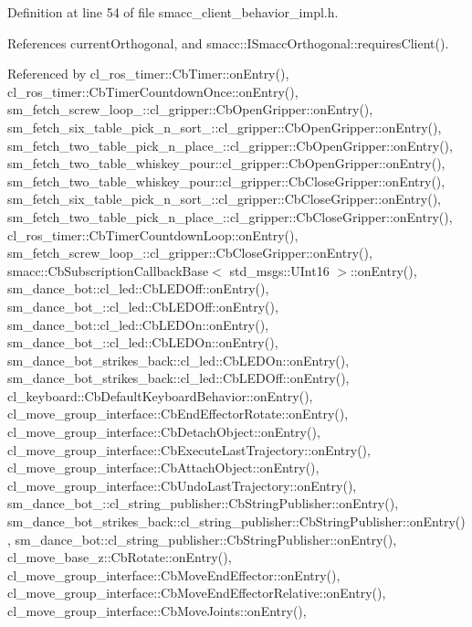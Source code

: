 Definition at line 54 of file smacc\+\_\+client\+\_\+behavior\+\_\+impl.\+h.



References current\+Orthogonal, and smacc\+::\+I\+Smacc\+Orthogonal\+::requires\+Client().



Referenced by cl\+\_\+ros\+\_\+timer\+::\+Cb\+Timer\+::on\+Entry(), cl\+\_\+ros\+\_\+timer\+::\+Cb\+Timer\+Countdown\+Once\+::on\+Entry(), sm\+\_\+fetch\+\_\+screw\+\_\+loop\+\_\+::cl\+\_\+gripper\+::\+Cb\+Open\+Gripper\+::on\+Entry(), sm\+\_\+fetch\+\_\+six\+\_\+table\+\_\+pick\+\_\+n\+\_\+sort\+\_\+::cl\+\_\+gripper\+::\+Cb\+Open\+Gripper\+::on\+Entry(), sm\+\_\+fetch\+\_\+two\+\_\+table\+\_\+pick\+\_\+n\+\_\+place\+\_\+::cl\+\_\+gripper\+::\+Cb\+Open\+Gripper\+::on\+Entry(), sm\+\_\+fetch\+\_\+two\+\_\+table\+\_\+whiskey\+\_\+pour\+::cl\+\_\+gripper\+::\+Cb\+Open\+Gripper\+::on\+Entry(), sm\+\_\+fetch\+\_\+two\+\_\+table\+\_\+whiskey\+\_\+pour\+::cl\+\_\+gripper\+::\+Cb\+Close\+Gripper\+::on\+Entry(), sm\+\_\+fetch\+\_\+six\+\_\+table\+\_\+pick\+\_\+n\+\_\+sort\+\_\+::cl\+\_\+gripper\+::\+Cb\+Close\+Gripper\+::on\+Entry(), sm\+\_\+fetch\+\_\+two\+\_\+table\+\_\+pick\+\_\+n\+\_\+place\+\_\+::cl\+\_\+gripper\+::\+Cb\+Close\+Gripper\+::on\+Entry(), cl\+\_\+ros\+\_\+timer\+::\+Cb\+Timer\+Countdown\+Loop\+::on\+Entry(), sm\+\_\+fetch\+\_\+screw\+\_\+loop\+\_\+::cl\+\_\+gripper\+::\+Cb\+Close\+Gripper\+::on\+Entry(), smacc\+::\+Cb\+Subscription\+Callback\+Base$<$ std\+\_\+msgs\+::\+U\+Int16 $>$\+::on\+Entry(), sm\+\_\+dance\+\_\+bot\+::cl\+\_\+led\+::\+Cb\+L\+E\+D\+Off\+::on\+Entry(), sm\+\_\+dance\+\_\+bot\+\_\+::cl\+\_\+led\+::\+Cb\+L\+E\+D\+Off\+::on\+Entry(), sm\+\_\+dance\+\_\+bot\+::cl\+\_\+led\+::\+Cb\+L\+E\+D\+On\+::on\+Entry(), sm\+\_\+dance\+\_\+bot\+\_\+::cl\+\_\+led\+::\+Cb\+L\+E\+D\+On\+::on\+Entry(), sm\+\_\+dance\+\_\+bot\+\_\+strikes\+\_\+back\+::cl\+\_\+led\+::\+Cb\+L\+E\+D\+On\+::on\+Entry(), sm\+\_\+dance\+\_\+bot\+\_\+strikes\+\_\+back\+::cl\+\_\+led\+::\+Cb\+L\+E\+D\+Off\+::on\+Entry(), cl\+\_\+keyboard\+::\+Cb\+Default\+Keyboard\+Behavior\+::on\+Entry(), cl\+\_\+move\+\_\+group\+\_\+interface\+::\+Cb\+End\+Effector\+Rotate\+::on\+Entry(), cl\+\_\+move\+\_\+group\+\_\+interface\+::\+Cb\+Detach\+Object\+::on\+Entry(), cl\+\_\+move\+\_\+group\+\_\+interface\+::\+Cb\+Execute\+Last\+Trajectory\+::on\+Entry(), cl\+\_\+move\+\_\+group\+\_\+interface\+::\+Cb\+Attach\+Object\+::on\+Entry(), cl\+\_\+move\+\_\+group\+\_\+interface\+::\+Cb\+Undo\+Last\+Trajectory\+::on\+Entry(), sm\+\_\+dance\+\_\+bot\+\_\+::cl\+\_\+string\+\_\+publisher\+::\+Cb\+String\+Publisher\+::on\+Entry(), sm\+\_\+dance\+\_\+bot\+\_\+strikes\+\_\+back\+::cl\+\_\+string\+\_\+publisher\+::\+Cb\+String\+Publisher\+::on\+Entry(), sm\+\_\+dance\+\_\+bot\+::cl\+\_\+string\+\_\+publisher\+::\+Cb\+String\+Publisher\+::on\+Entry(), cl\+\_\+move\+\_\+base\+\_\+z\+::\+Cb\+Rotate\+::on\+Entry(), cl\+\_\+move\+\_\+group\+\_\+interface\+::\+Cb\+Move\+End\+Effector\+::on\+Entry(), cl\+\_\+move\+\_\+group\+\_\+interface\+::\+Cb\+Move\+End\+Effector\+Relative\+::on\+Entry(), cl\+\_\+move\+\_\+group\+\_\+interface\+::\+Cb\+Move\+Joints\+::on\+Entry(), 